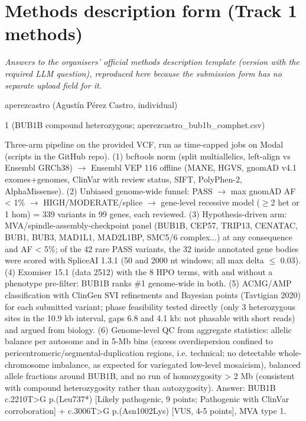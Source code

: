 \section{Methods description form (Track 1 methods)}
\textit{Answers to the organisers' official methods description template (version with the required LLM question), reproduced here because the submission form has no separate upload field for it.}

\begin{description}[leftmargin=0pt,style=nextline,itemsep=4pt,font=\sffamily\bfseries\small\color{branddark}]
\item[Team name] aperezcastro (Agustín Pérez Castro, individual)
\item[Model number (fill out this form once per model/approach submitted; up to 6)] 1 (BUB1B compound heterozygous; aperezcastro\_bub1b\_comphet.csv)
\item[Please describe your model/approach in detail.] Three-arm pipeline on the provided VCF, run as time-capped jobs on Modal (scripts in the GitHub repo). (1) bcftools norm (split multiallelics, left-align vs Ensembl GRCh38) $\rightarrow$ Ensembl VEP 116 offline (MANE, HGVS, gnomAD v4.1 exomes+genomes, ClinVar with review status, SIFT, PolyPhen-2, AlphaMissense). (2) Unbiased genome-wide funnel: PASS $\rightarrow$ max gnomAD AF < 1\% $\rightarrow$ HIGH/MODERATE/splice $\rightarrow$ gene-level recessive model ($\geq$2 het or 1 hom) = 339 variants in 99 genes, each reviewed. (3) Hypothesis-driven arm: MVA/spindle-assembly-checkpoint panel (BUB1B, CEP57, TRIP13, CENATAC, BUB1, BUB3, MAD1L1, MAD2L1BP, SMC5/6 complex...) at any consequence and AF < 5\%; of the 42 rare PASS variants, the 32 inside annotated gene bodies were scored with SpliceAI 1.3.1 (50 and 2000 nt windows; all max delta $\leq$ 0.03). (4) Exomiser 15.1 (data 2512) with the 8 HPO terms, with and without a phenotype pre-filter: BUB1B ranks \#1 genome-wide in both. (5) ACMG/AMP classification with ClinGen SVI refinements and Bayesian points (Tavtigian 2020) for each submitted variant; phase feasibility tested directly (only 3 heterozygous sites in the 10.9 kb interval, gaps 6.8 and 4.1 kb: not phasable with short reads) and argued from biology. (6) Genome-level QC from aggregate statistics: allelic balance per autosome and in 5-Mb bins (excess overdispersion confined to pericentromeric/segmental-duplication regions, i.e. technical; no detectable whole-chromosome imbalance, as expected for variegated low-level mosaicism), balanced allele fractions around BUB1B, and no run of homozygosity > 2 Mb (consistent with compound heterozygosity rather than autozygosity). Answer: BUB1B c.2210T>G p.(Leu737*) [Likely pathogenic, 9 points; Pathogenic with ClinVar corroboration] + c.3006T>G p.(Asn1002Lys) [VUS, 4-5 points], MVA type 1.

\end{description}
